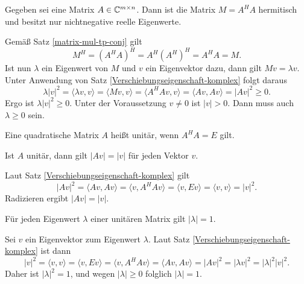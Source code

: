 \begin{Satz}
Gegeben sei eine Matrix $A\in\mathbb C^{m\times n}$.
Dann ist die Matrix $M=A^H A$ hermitisch und besitzt nur
nichtnegative reelle Eigenwerte.
\end{Satz}
\begin{Beweis}
Gemäß Satz \ref{matrix-mul-tp-conj} gilt
\begin{equation}
M^H = (A^H A)^H = A^H (A^H)^H = A^H A = M.
\end{equation}
Ist nun $\lambda$ ein Eigenwert von $M$ und $v$ ein Eigenvektor dazu,
dann gilt $Mv=\lambda v$. Unter Anwendung von Satz
\ref{Verschiebungseigenschaft-komplex} folgt daraus
\begin{equation}
\lambda |v|^2 = \langle\lambda v,v\rangle
= \langle Mv,v\rangle = \langle A^H Av,v\rangle
= \langle Av,Av\rangle = |Av|^2\ge 0.
\end{equation}
Ergo ist $\lambda|v|^2\ge 0$. Unter der Voraussetzung $v\ne 0$
ist $|v|>0$. Dann muss auch $\lambda\ge 0$ sein.\;\qedsymbol
\end{Beweis}

\begin{Definition}\newlinefirst
Eine quadratische Matrix $A$ heißt unitär, wenn $A^H A=E$ gilt.
\end{Definition}

\begin{Satz}
Ist $A$ unitär, dann gilt $|Av|=|v|$ für jeden Vektor $v$.
\end{Satz}
\begin{Beweis}
Laut Satz \ref{Verschiebungseigenschaft-komplex} gilt
\[|Av|^2 = \langle Av,Av\rangle = \langle v,A^H Av\rangle
= \langle v,Ev\rangle = \langle v,v\rangle = |v|^2.\]
Radizieren ergibt $|Av|=|v|$.\;\qedsymbol
\end{Beweis}

\begin{Satz}
Für jeden Eigenwert $\lambda$ einer unitären Matrix gilt $|\lambda|=1$.
\end{Satz}
\begin{Beweis}
Sei $v$ ein Eigenvektor zum Eigenwert $\lambda$. Laut Satz
\ref{Verschiebungseigenschaft-komplex} ist dann
\[|v|^2 = \langle v,v\rangle = \langle v,Ev\rangle
= \langle v,A^H Av\rangle = \langle Av,Av\rangle
= |Av|^2 = |\lambda v|^2
= |\lambda|^2 |v|^2.\]
Daher ist $|\lambda|^2=1$, und wegen $|\lambda|\ge 0$ folglich $|\lambda|=1$.\;\qedsymbol
\end{Beweis}



